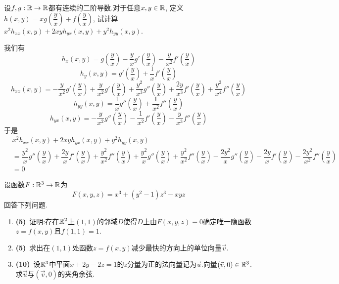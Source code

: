 \documentclass{ctexart}
\begin{document}
\begin{problem}[5.(15\songti{分})]
    设$f,g:\mathbb{R}\to\mathbb{R}$都有连续的二阶导数.对于任意$x,y\in\mathbb{R}$,
    定义$h(x,y)=xg\left(\dfrac{y}{x}\right)+f\left(\dfrac{y}{x}\right)$,
    试计算$x^2h_{xx}(x,y)+2xyh_{yx}(x,y)+y^2h_{yy}(x,y)$.
\end{problem}
\begin{solution}
    我们有
    \[h_x(x,y)=g\left(\dfrac{y}{x}\right)-\dfrac{y}{x}g'\left(\dfrac{y}{x}\right)-\dfrac{y}{x^2}f'\left(\dfrac{y}{x}\right)\]
    \[h_y(x,y)=g'\left(\dfrac{y}{x}\right)+\dfrac{1}{x}f'\left(\dfrac{y}{x}\right)\]
    \[h_{xx}(x,y)=-\dfrac{y}{x^2}g'\left(\dfrac{y}{x}\right)+\dfrac{y}{x^2}g'\left(\dfrac{y}{x}\right)+\dfrac{y^2}{x^3}g''\left(\dfrac{y}{x}\right)+\dfrac{2y}{x^3}f'\left(\dfrac{y}{x}\right)+\dfrac{y^2}{x^4}f''\left(\dfrac{y}{x}\right)\]
    \[h_{yy}(x,y)=\dfrac{1}{x}g''\left(\dfrac{y}{x}\right)+\dfrac{1}{x^2}f''\left(\dfrac{y}{x}\right)\]
    \[h_{yx}(x,y)=-\dfrac{y}{x^2}g''\left(\dfrac{y}{x}\right)-\dfrac{1}{x^2}f'\left(\dfrac{y}{x}\right)-\dfrac{y}{x^3}f''\left(\dfrac{y}{x}\right)\]
    于是
    \[\begin{aligned}
        &x^2h_{xx}(x,y)+2xyh_{yx}(x,y)+y^2h_{yy}(x,y)\\
        &=\dfrac{y^2}{x}g''\left(\dfrac{y}{x}\right)+\dfrac{2y}{x}f'\left(\dfrac{y}{x}\right)+\dfrac{y^2}{x^2}f''\left(\dfrac{y}{x}\right)+\dfrac{y^2}{x}g''\left(\dfrac{y}{x}\right)+\dfrac{y^2}{x^2}f''\left(\dfrac{y}{x}\right)-\dfrac{2y^2}{x}g''\left(\dfrac{y}{x}\right)-\dfrac{2y}{x}f'\left(\dfrac{y}{x}\right)-\dfrac{2y^2}{x^2}f''\left(\dfrac{y}{x}\right) \\
        &=0
    \end{aligned}\]
\end{solution}
\begin{problem}[6.(20\songti{分})]
    设函数$F:\mathbb{R}^3\to\mathbb{R}$为\[F(x,y,z)=x^3+(y^2-1)z^3-xyz\]回答下列问题.
    \begin{enumerate}[label=\textbf{(\arabic*)},leftmargin=*]
        \item \textbf{(5)}\ 证明:存在$\mathbb{R}^2$上$(1,1)$的邻域$D$使得$D$上由$F(x,y,z)\equiv0$确定唯一隐函数$z=f(x,y)$且$f(1,1)=1$.
        \item \textbf{(5)}\ 求出在$(1,1)$处函数$z=f(x,y)$减少最快的方向上的单位向量$\vec{v}$.
        \item \textbf{(10)}\ 设$\mathbb{R}^3$中平面$x+2y-2z=1$的$z$分量为正的法向量记为$\vec{u}$.向量$(\vec{v},0)\in\mathbb{R}^3$.求$\vec{u}$与$(\vec{v},0)$的夹角余弦.
    \end{enumerate}
\end{problem}
\end{document}
